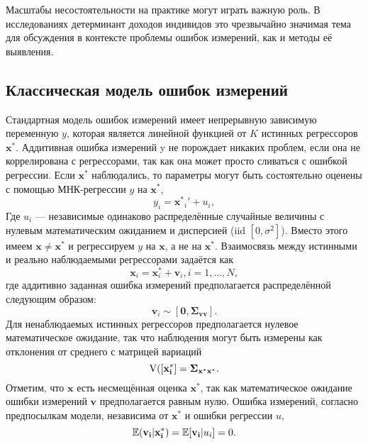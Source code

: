 Масштабы несостоятельности на практике могут играть важную роль. В исследованиях детерминант доходов индивидов это чрезвычайно значимая тема для обсуждения в контексте проблемы ошибок измерений, как и методы её выявления.

\subsection{Классическая модель ошибок измерений} 
Стандартная модель ошибок измерений имеет непрерывную зависимую переменную $y$, которая является линейной функцией от $K$ истинных регрессоров $\mathbf{x^*}$. Аддитивная ошибка измерений y не порождает никаких проблем, если она не коррелирована с регрессорами, так как она может просто сливаться с ошибкой регрессии. Если $\mathbf{x^*}$ наблюдались, то параметры могут быть состоятельно оценены с помощью МНК-регрессии $y$ на $\mathbf{x^*}$,
\[
y_i=\mathbf{x^*}_i'+u_i,
\]
Где $u_i$ --- независимые одинаково распределённые случайные величины с нулевым математическим ожиданием и дисперсией (iid $[0,\sigma^2]$). Вместо этого имеем $\mathbf{x}\neq \mathbf{x^*}$ и регрессируем $y$ на $\mathbf{x}$, а не на $\mathbf{x^*}$. Взаимосвязь между истинными и реально наблюдаемыми регрессорами задаётся как
\begin{equation}
\mathbf{x}_i=\mathbf{x}_i^*+\mathbf{v}_i, i=1,…,N,
\end{equation}
где аддитивно заданная ошибка измерений предполагается распределённой следующим образом:
\begin{equation}
\mathbf{v}_i \sim [\mathbf{0},\mathbf{\Sigma_{vv}}].
\end{equation}
Для ненаблюдаемых истинных регрессоров предполагается нулевое математическое ожидание, так что наблюдения могут быть измерены как отклонения от среднего с матрицей вариаций
\begin{equation}
\mathrm{V}\mathbf{([x^*_i]}=\mathbf{\Sigma_{x^*x^*}}.
\end{equation}
Отметим, что $\mathbf{x}$ есть несмещённая оценка $\mathbf{x^*}$, так как математическое ожидание ошибки измерений $\mathbf{v}$ предполагается равным нулю. Ошибка измерений, согласно предпосылкам модели, независима от $\mathbf{x^*}$ и ошибки регрессии $u$,
\begin{equation}
\mathbb{E}(\mathbf{v_i}|\mathbf{x^*_i})=\mathbb{E}[\mathbf{v_i}|u_i]=0.
\end{equation}

